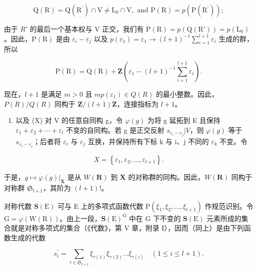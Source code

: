 \[
\mathrm{Q} (\mathrm{R}) = \mathrm{Q} \left(\mathrm{R} ^ {\prime}\right) \cap \mathrm{V} \neq \mathrm{L} _ {0} \cap \mathrm{V}, \text { and } \mathrm{P} (\mathrm{R}) = p \left(\mathrm{P} \left(\mathrm{R} ^ {\prime}\right)\right);
\]

由于 \(R'\) 的最后一个基本权与 V 正交，我们有 \(\mathrm{P}(\mathrm{R}) = p(\mathrm{Q}(\mathrm{R}')) = p(\mathrm{L}_0)\)。因此，\(\mathrm{P}(\mathrm{R})\) 是由 \(\varepsilon_i - \varepsilon_j\) 以及 \(p(\varepsilon_1) = \varepsilon_1 \to (l + 1)^{-1} \sum_{i=1}^{l+1} \varepsilon_i\) 生成的群，所以

\[
\mathrm{P} (\mathrm{R}) = \mathrm{Q} (\mathrm{R}) + \mathbf {Z} \left(\varepsilon_ {1} - (l + 1) ^ {- 1} \sum_ {i = 1} ^ {l + 1} \varepsilon_ {i}\right).
\]

现在，\(l + 1\) 是满足 \(m > 0\) 且 \(mp(\varepsilon_1) \in Q(R)\) 的最小整数。因此，\(P(R)/Q(R)\) 同构于 \(\mathbf{Z}/(l + 1)\mathbf{Z}\)，连接指标为 \(l + 1\)。

\begin{enumerate}
\def\labelenumi{(\Roman{enumi})}
\setcounter{enumi}{8}
\tightlist
\item
  以及 (X) 对 V 的任意自同构 g，令 \(\varphi(g)\) 为将 g 延拓到 E 且保持 \(\varepsilon_{1} + \varepsilon_{2} + \cdots + \varepsilon_{l}\) 不变的自同构。若 g 是正交反射 \(s_{\varepsilon_{i} - \varepsilon_{j}}|V\)，则 \(\varphi(g)\) 等于 \(s_{\varepsilon_{i} - \varepsilon_{j}}\)；后者将 \(\varepsilon_{i}\) 与 \(\varepsilon_{j}\) 互换，并保持所有下标 k 与 i、j 不同的 \(\varepsilon_{k}\) 不变。令
\end{enumerate}

\[
X = \left\{\varepsilon_ {1}, \varepsilon_ {2}, \dots , \varepsilon_ {l + 1} \right\}.
\]

于是，\(g \mapsto \varphi(g)|_{\mathbf{X}}\) 是从 \(W(\mathbf{R})\) 到 \(\mathbf{X}\) 的对称群的同构。因此，\(W(\mathbf{R})\) 同构于对称群 \(\mathfrak{S}_{l+1}\)，其阶为 \((l+1)!\)。

对称代数 \(\mathbf{S}(\mathrm{E})\) 可与 E 上的多项式函数代数 \(\mathrm{P}(\xi_1, \xi_2, \ldots, \xi_{l+1})\) 作规范识别。令 \(\mathrm{G} = \varphi(\mathrm{W}(\mathrm{R}))\)。由上一段，\(\mathbf{S}(\mathrm{E})^{\mathrm{G}}\) 中在 G 下不变的 \(\mathbf{S}(\mathrm{E})\) 元素所成的集合就是对称多项式的集合（《代数》，第 V 章，附录 I），因而（同上）是由下列函数生成的代数

\[
s _ {i} ^ {\prime} = \sum_ {\tau \in \mathfrak {S} _ {l + 1}} \xi_ {\tau (1)} \xi_ {\tau (2)} \dots \xi_ {\tau (i)} \quad (1 \leqslant i \leqslant l + 1).
\]

